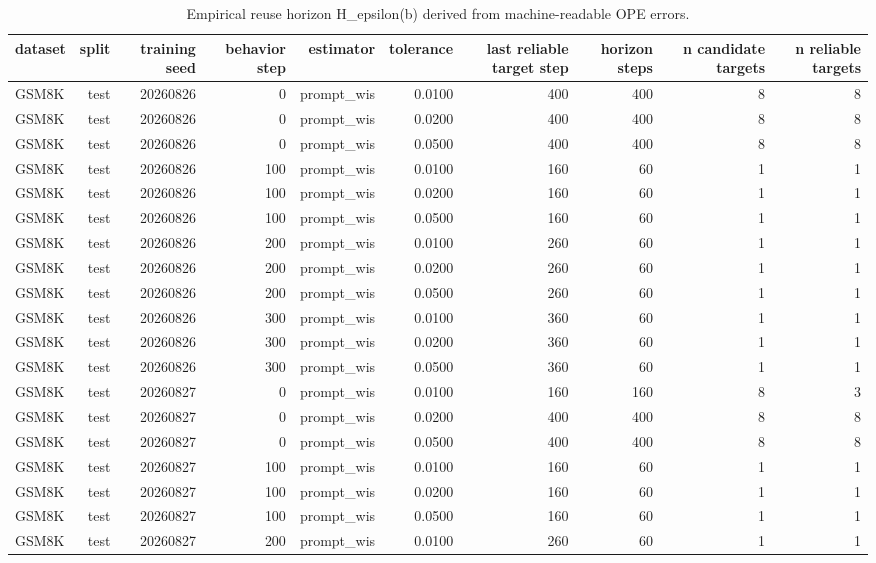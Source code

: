\begin{table}[t]
\centering
\small
\caption{Empirical reuse horizon H\_epsilon(b) derived from machine-readable OPE errors.}
\label{tab:reuse\_horizon}
\begin{tabular}{lrrrrrrrrr}
\toprule
dataset & split & training seed & behavior step & estimator & tolerance & last reliable target step & horizon steps & n candidate targets & n reliable targets \\
\midrule
GSM8K & test & 20260826 & 0 & prompt\_wis & 0.0100 & 400 & 400 & 8 & 8 \\
GSM8K & test & 20260826 & 0 & prompt\_wis & 0.0200 & 400 & 400 & 8 & 8 \\
GSM8K & test & 20260826 & 0 & prompt\_wis & 0.0500 & 400 & 400 & 8 & 8 \\
GSM8K & test & 20260826 & 100 & prompt\_wis & 0.0100 & 160 & 60 & 1 & 1 \\
GSM8K & test & 20260826 & 100 & prompt\_wis & 0.0200 & 160 & 60 & 1 & 1 \\
GSM8K & test & 20260826 & 100 & prompt\_wis & 0.0500 & 160 & 60 & 1 & 1 \\
GSM8K & test & 20260826 & 200 & prompt\_wis & 0.0100 & 260 & 60 & 1 & 1 \\
GSM8K & test & 20260826 & 200 & prompt\_wis & 0.0200 & 260 & 60 & 1 & 1 \\
GSM8K & test & 20260826 & 200 & prompt\_wis & 0.0500 & 260 & 60 & 1 & 1 \\
GSM8K & test & 20260826 & 300 & prompt\_wis & 0.0100 & 360 & 60 & 1 & 1 \\
GSM8K & test & 20260826 & 300 & prompt\_wis & 0.0200 & 360 & 60 & 1 & 1 \\
GSM8K & test & 20260826 & 300 & prompt\_wis & 0.0500 & 360 & 60 & 1 & 1 \\
GSM8K & test & 20260827 & 0 & prompt\_wis & 0.0100 & 160 & 160 & 8 & 3 \\
GSM8K & test & 20260827 & 0 & prompt\_wis & 0.0200 & 400 & 400 & 8 & 8 \\
GSM8K & test & 20260827 & 0 & prompt\_wis & 0.0500 & 400 & 400 & 8 & 8 \\
GSM8K & test & 20260827 & 100 & prompt\_wis & 0.0100 & 160 & 60 & 1 & 1 \\
GSM8K & test & 20260827 & 100 & prompt\_wis & 0.0200 & 160 & 60 & 1 & 1 \\
GSM8K & test & 20260827 & 100 & prompt\_wis & 0.0500 & 160 & 60 & 1 & 1 \\
GSM8K & test & 20260827 & 200 & prompt\_wis & 0.0100 & 260 & 60 & 1 & 1 \\

\end{tabular}
\end{table}
